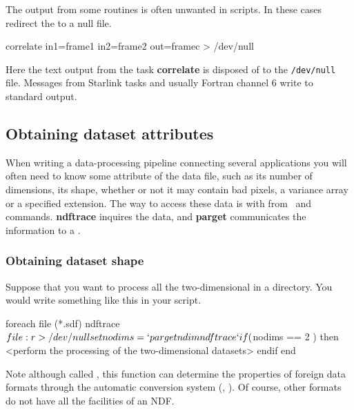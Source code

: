 \documentclass[twoside,11pt,nolof]{starlink}
\providecommand{\KAPPAref}{\xref{{\footnotesize KAPPA}}{sun95}{}}
\providecommand{\NDFref}[1]{\xref{#1}{sun33}{}}
\begin{document}
The output from some routines is often unwanted in scripts.  In these
cases redirect the  to a
null file.

\begin{small}
\begin{terminalv}
     correlate in1=frame1 in2=frame2 out=framec > /dev/null
\end{terminalv}
\end{small}
Here the text output from the task \textbf{correlate} is disposed of to
the \texttt{/dev/null} file.  Messages from Starlink tasks and usually
Fortran channel 6 write to \textsf{standard output}.

\newpage
\subsection{Obtaining dataset
attributes\label{sc4_se_dataset_attributes}}

When writing a data-processing pipeline connecting several applications
you will often need to know some attribute of the data file, such as
its number of dimensions, its shape, whether or not it may contain bad
pixels, a variance array or a specified extension.  The way to
access these data is with  from
\KAPPAref\ and  commands.
\textbf{ndftrace} inquires the data, and \textbf{parget} communicates the
information to a .

\subsubsection{Obtaining dataset shape
\label{sc4_se_dataset_shape}}

Suppose that you want to process all the two-dimensional \NDFref{{\sf
NDF}s} in a directory.  You would write something like this in your
script.

\begin{small}
\begin{terminalv}
     foreach file (*.sdf)
        ndftrace $file:r > /dev/null
        set nodims = `parget ndim ndftrace`
        if ( $nodims == 2 ) then
           <perform the processing of the two-dimensional datasets>
        endif
     end
\end{terminalv}
\end{small}

Note although called , this
function can determine the properties of foreign data formats through
the automatic conversion system (,
).  Of course, other formats do not have all the
facilities of an NDF.
\end{document}
